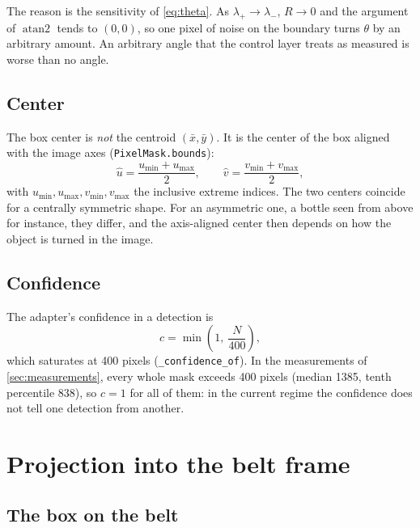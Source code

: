 \documentclass[11pt,a4paper]{article}
\theoremstyle{definition}
\theoremstyle{remark}
\newcommand{\code}[1]{\texttt{#1}}
\DeclareMathOperator{\atantwo}{atan2}
\begin{document}
The reason is the sensitivity of \eqref{eq:theta}. As $\lambda_+\to\lambda_-$,
$R\to0$ and the argument of $\atantwo$ tends to $(0,0)$, so one pixel of noise
on the boundary turns $\theta$ by an arbitrary amount. An arbitrary angle that
the control layer treats as measured is worse than no angle.

\subsection{Center}

The box center is \emph{not} the centroid $(\bar x,\bar y)$. It is the center
of the box aligned with the image axes (\code{PixelMask.bounds}):
\begin{equation}
\label{eq:center}
\hat u = \frac{u_{\min}+u_{\max}}{2},\qquad
\hat v = \frac{v_{\min}+v_{\max}}{2},
\end{equation}
with $u_{\min}, u_{\max}, v_{\min}, v_{\max}$ the inclusive extreme indices. The
two centers coincide for a centrally symmetric shape. For an asymmetric one, a
bottle seen from above for instance, they differ, and the axis-aligned center
then depends on how the object is turned in the image.

\subsection{Confidence}

The adapter's confidence in a detection is
\begin{equation}
c = \min\!\left(1,\ \frac{N}{400}\right),
\end{equation}
which saturates at 400 pixels (\code{\_confidence\_of}). In the measurements of
\cref{sec:measurements}, every whole mask exceeds 400 pixels (median 1385, tenth
percentile 838), so $c=1$ for all of them: in the current regime the confidence
does not tell one detection from another.

\section{Projection into the belt frame}
\label{sec:projection}

\subsection{The box on the belt}
\end{document}
